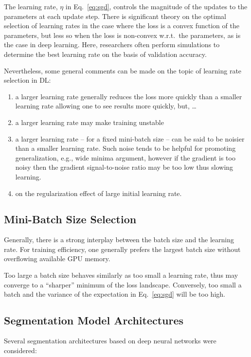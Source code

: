 \documentclass[11pt]{article} %
\begin{document}
The learning rate, $\eta$ in Eq.~\eqref{eq:sgd}, controls the magnitude of the 
updates to the parameters at each update step. There is significant theory on
the optimal selection of learning rates in the case where the loss is a convex
function of the parameters, but less so when the loss is non-convex w.r.t.~the
parameters, as is the case in deep learning. Here, researchers often perform
simulations to determine the best learning rate on the basis of validation 
accuracy.

Nevertheless, some general comments can be made on the topic of learning rate 
selection in DL: 

\begin{enumerate}
\item a larger learning rate generally reduces the loss more quickly than a
smaller learning rate allowing one to see results more quickly, but, \dots
\item a larger learning rate may make training unstable
\item a larger learning rate -- for a fixed mini-batch size -- can be said to
be noisier than a smaller learning rate. Such noise tends to be helpful for 
promoting generalization, e.g., wide minima argument, however if the gradient 
is too noisy then the gradient signal-to-noise ratio may be too low thus 
slowing learning.
\item on the regularization effect of large initial learning rate.
\end{enumerate}

\subsection{Mini-Batch Size Selection}

Generally, there is a strong interplay between the batch size and the learning
rate. For training efficiency, one generally prefers the largest batch size
without overflowing available GPU memory.

Too large a batch size behaves similarly as too small a learning rate, thus may 
converge to a ``sharper'' minimum of the loss landscape. Conversely, too small 
a batch and the variance of the expectation in Eq.~\eqref{eq:sgd} will be too 
high.

\subsection{Segmentation Model Architectures}

Several segmentation architectures based on deep neural networks were
considered: 
\end{document}
